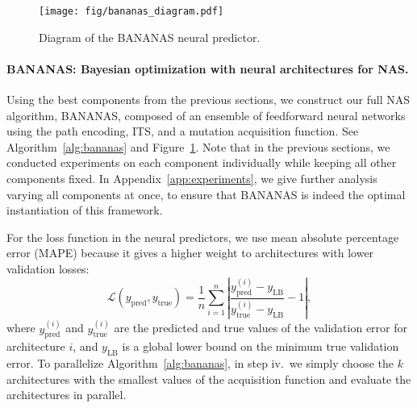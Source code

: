 \documentclass[11pt]{article}
\numberwithin{equation}{section}
\numberwithin{figure}{section}
\theoremstyle{plain}
\theoremstyle{definition}
\begin{document}
\begin{figure}
\centering
    \texttt{[image: fig/bananas\_diagram.pdf]}
    \caption{Diagram of the BANANAS neural predictor.}
    \label{fig:bananas_diagram}
\end{figure}

\paragraph{BANANAS: Bayesian optimization with neural architectures for NAS.}
Using the best components from the previous sections, we construct our full NAS algorithm,
BANANAS, composed of an ensemble of feedforward neural networks using the path encoding,
ITS, and a mutation acquisition function.
See Algorithm~\ref{alg:bananas} and Figure~\ref{fig:bananas_diagram}.
Note that in the previous sections, we conducted experiments on each component
individually while keeping all other components fixed.
In Appendix~\ref{app:experiments},
we give further analysis varying all components at
once, to ensure that BANANAS is indeed the optimal instantiation of this framework. 

For the loss function in the neural predictors, 
we use mean absolute percentage error (MAPE) because it gives a higher weight to
architectures with lower validation losses:
\begin{equation}
\mathcal{L}(y_\text{pred}, y_\text{true}) =
    \frac{1}{n}\sum_{i=1}^n \left| \frac{y_\text{pred}^{(i)} - y_\text{LB}}{y_\text{true}^{(i)} - y_\text{LB}} - 1\right|,\label{eq:mape}
\end{equation}
where $y_\text{pred}^{(i)}$ and $y_\text{true}^{(i)}$ are the predicted and true values of the validation error for architecture $i$, and $y_\text{LB}$ is a global lower bound on the minimum true validation error.
To parallelize Algorithm~\ref{alg:bananas}, in step iv.\ we simply choose the $k$ architectures with the smallest values of the acquisition function and evaluate the architectures in parallel.
\end{document}
